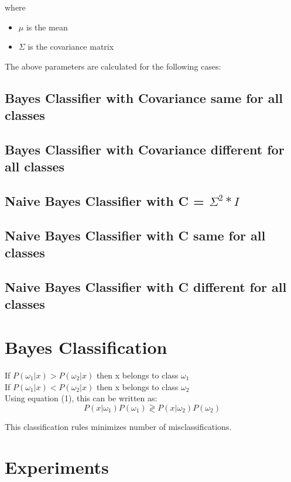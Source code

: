 \documentclass[11pt,a4paper]{article}
\begin{document}
 where
 \begin{itemize}
 	\item $\mu$ is the mean 
 	\item $\Sigma$ is the covariance matrix
 \end{itemize}
 
 The above parameters are calculated for the following cases:
 \subsection{Bayes Classifier with Covariance same for all classes}
 \subsection{Bayes Classifier with Covariance different for all classes}
 \subsection{Naive Bayes Classifier with C = $\Sigma^2*I$}
 \subsection{Naive Bayes Classifier with C same for all classes}
 \subsection{Naive Bayes Classifier with C different for all classes} 

\section{Bayes Classification}

If $P(\omega_1 | x) > P(\omega_2 | x)$ then x belongs to class $\omega_1$
\\If $P(\omega_1 | x) < P(\omega_2 | x)$ then x belongs to class $\omega_2$\\

Using equation (1), this can be written as:
 \begin{equation}
 {P(x| \omega_1)P(\omega_1) \gtrless P(x | \omega_2)P(\omega_2)}
 \end{equation}

This classification rules minimizes number of misclassifications. 

\section{Experiments}
\end{document}
